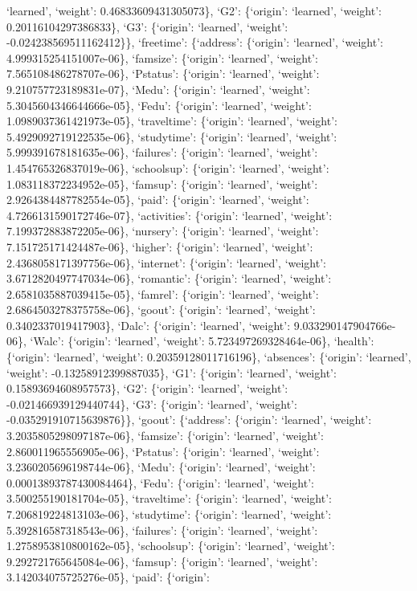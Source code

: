 \documentclass[
]{article}
\begin{document}
`learned', `weight': 0.46833609431305073\}, `G2': \{`origin': `learned',
`weight': 0.20116104297386833\}, `G3': \{`origin': `learned', `weight':
-0.024238569511162412\}\}, `freetime': \{`address': \{`origin':
`learned', `weight': 4.999315254151007e-06\}, `famsize': \{`origin':
`learned', `weight': 7.565108486278707e-06\}, `Pstatus': \{`origin':
`learned', `weight': 9.210757723189831e-07\}, `Medu': \{`origin':
`learned', `weight': 5.3045604346644666e-05\}, `Fedu': \{`origin':
`learned', `weight': 1.0989037361421973e-05\}, `traveltime': \{`origin':
`learned', `weight': 5.4929092719122535e-06\}, `studytime': \{`origin':
`learned', `weight': 5.999391678181635e-06\}, `failures': \{`origin':
`learned', `weight': 1.454765326837019e-06\}, `schoolsup': \{`origin':
`learned', `weight': 1.083118372234952e-05\}, `famsup': \{`origin':
`learned', `weight': 2.9264384487782554e-05\}, `paid': \{`origin':
`learned', `weight': 4.7266131590172746e-07\}, `activities': \{`origin':
`learned', `weight': 7.199372883872205e-06\}, `nursery': \{`origin':
`learned', `weight': 7.151725171424487e-06\}, `higher': \{`origin':
`learned', `weight': 2.4368058171397756e-06\}, `internet': \{`origin':
`learned', `weight': 3.6712820497747034e-06\}, `romantic': \{`origin':
`learned', `weight': 2.6581035887039415e-05\}, `famrel': \{`origin':
`learned', `weight': 2.6864503278375758e-06\}, `goout': \{`origin':
`learned', `weight': 0.3402337019417903\}, `Dalc': \{`origin':
`learned', `weight': 9.033290147904766e-06\}, `Walc': \{`origin':
`learned', `weight': 5.723497269328464e-06\}, `health': \{`origin':
`learned', `weight': 0.20359128011716196\}, `absences': \{`origin':
`learned', `weight': -0.13258912399887035\}, `G1': \{`origin':
`learned', `weight': 0.15893694608957573\}, `G2': \{`origin': `learned',
`weight': -0.021466939129440744\}, `G3': \{`origin': `learned',
`weight': -0.035291910715639876\}\}, `goout': \{`address': \{`origin':
`learned', `weight': 3.2035805298097187e-06\}, `famsize': \{`origin':
`learned', `weight': 2.860011965556905e-06\}, `Pstatus': \{`origin':
`learned', `weight': 3.2360205696198744e-06\}, `Medu': \{`origin':
`learned', `weight': 0.00013893787430084464\}, `Fedu': \{`origin':
`learned', `weight': 3.500255190181704e-05\}, `traveltime': \{`origin':
`learned', `weight': 7.206819224813103e-06\}, `studytime': \{`origin':
`learned', `weight': 5.392816587318543e-06\}, `failures': \{`origin':
`learned', `weight': 1.2758953810800162e-05\}, `schoolsup': \{`origin':
`learned', `weight': 9.292721765645084e-06\}, `famsup': \{`origin':
`learned', `weight': 3.142034075725276e-05\}, `paid': \{`origin':
\end{document}
